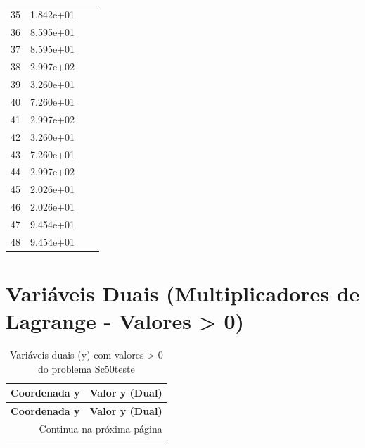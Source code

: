 \documentclass[12pt]{article}
\begin{document}
\begin{longtable}{@{}cccc@{}}
35 & 1.842e+01 &  &  \\
36 & 8.595e+01 &  &  \\
37 & 8.595e+01 &  &  \\
38 & 2.997e+02 &  &  \\
39 & 3.260e+01 &  &  \\
40 & 7.260e+01 &  &  \\
41 & 2.997e+02 &  &  \\
42 & 3.260e+01 &  &  \\
43 & 7.260e+01 &  &  \\
44 & 2.997e+02 &  &  \\
45 & 2.026e+01 &  &  \\
46 & 2.026e+01 &  &  \\
47 & 9.454e+01 &  &  \\
48 & 9.454e+01 &  &  \\

\bottomrule
\end{longtable}


\section{Variáveis Duais (Multiplicadores de Lagrange - Valores > 0)}

\begin{longtable}{@{}cc@{}}
\caption{Variáveis duais (y) com valores > 0 do problema Sc50teste} \\
\toprule
\textbf{Coordenada y} & \textbf{Valor y (Dual)} \\
\midrule
\endfirsthead

\toprule
\textbf{Coordenada y} & \textbf{Valor y (Dual)} \\
\midrule
\endhead

\midrule \multicolumn{2}{r}{{Continua na próxima página}} \\ \midrule
\endfoot

\bottomrule
\endlastfoot

\bottomrule
\end{longtable}
\end{document}
